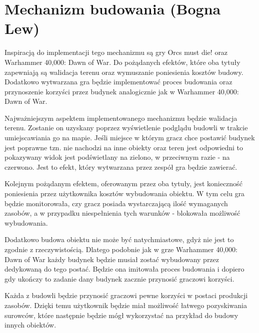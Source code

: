 \section{Mechanizm budowania (Bogna Lew)}\label{chap:build}
Inspiracją do implementacji tego mechanizmu są gry Orcs must die! oraz Warhammer 40,000: Dawn of War. Do pożądanych
efektów, które oba tytuły zapewniają są walidacja terenu oraz wymuszanie poniesienia kosztów budowy. Dodatkowo
wytwarzana gra będzie implementować proces budowania oraz przynoszenie korzyści przez budynek analogicznie jak w
Warhammer 40,000: Dawn of War.

Najważniejszym aspektem implementowanego mechanizmu będzie walidacja terenu. Zostanie on uzyskany poprzez wyświetlenie
podglądu budowli w trakcie umiejscawiania go na mapie. Jeśli miejsce w którym gracz chce postawić budynek jest poprawne
tzn. nie nachodzi na inne obiekty oraz teren jest odpowiedni to pokazywany widok jest podświetlany na zielono, w
przeciwnym razie - na czerwono. Jest to efekt, który wytwarzana przez zespół gra będzie zawierać.

Kolejnym pożądanym efektem, oferowanym przez oba tytuły, jest konieczność poniesienia przez użytkownika kosztów
wybudowania obiektu. W tym celu gra będzie monitorowała, czy gracz posiada wystarczającą ilość wymaganych zasobów, a w
przypadku niespełnienia tych warunków - blokowała możliwość wybudowania.

Dodatkowo budowa obiektu nie może być natychmiastowe, gdyż nie jest to zgodnie z rzeczywistością. Dlatego podobnie jak w
grze Warhammer 40,000: Dawn of War każdy budynek będzie musiał zostać wybudowany przez dedykowaną do tego postać. Będzie
ona imitowała proces budowania i dopiero gdy ukończy to zadanie dany budynek zacznie przynosić graczowi korzyści.

Każda z budowli będzie przynosić graczowi pewne korzyści w postaci produkcji zasobów. Dzięki temu użytkownik będzie miał
możliwość łatwego pozyskiwania surowców, które następnie będzie mógł wykorzystać na przykład do budowy innych obiektów.
